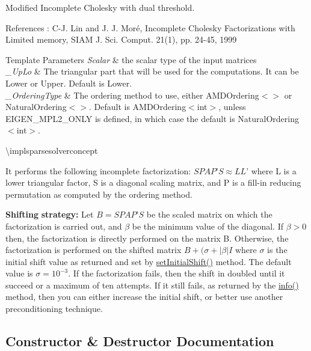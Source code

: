 Modified Incomplete Cholesky with dual threshold. 

References \+: C-\/J. Lin and J. J. Moré, Incomplete Cholesky Factorizations with Limited memory, S\+I\+AM J. Sci. Comput. 21(1), pp. 24-\/45, 1999


\begin{DoxyTemplParams}{Template Parameters}
{\em Scalar} & the scalar type of the input matrices \\
\hline
{\em \+\_\+\+Up\+Lo} & The triangular part that will be used for the computations. It can be Lower or Upper. Default is Lower. \\
\hline
{\em \+\_\+\+Ordering\+Type} & The ordering method to use, either A\+M\+D\+Ordering$<$$>$ or Natural\+Ordering$<$$>$. Default is A\+M\+D\+Ordering$<$int$>$, unless E\+I\+G\+E\+N\+\_\+\+M\+P\+L2\+\_\+\+O\+N\+LY is defined, in which case the default is Natural\+Ordering$<$int$>$.\\
\hline
\end{DoxyTemplParams}
\textbackslash{}implsparsesolverconcept

It performs the following incomplete factorization\+: $ S P A P\text{'} S \approx L L\text{'} $ where L is a lower triangular factor, S is a diagonal scaling matrix, and P is a fill-\/in reducing permutation as computed by the ordering method.

{\bfseries{Shifting}} {\bfseries{strategy\+:}} Let $ B = S P A P\text{'} S $ be the scaled matrix on which the factorization is carried out, and $ \beta $ be the minimum value of the diagonal. If $ \beta > 0 $ then, the factorization is directly performed on the matrix B. Otherwise, the factorization is performed on the shifted matrix $ B + (\sigma+|\beta| I $ where $ \sigma $ is the initial shift value as returned and set by \mbox{\hyperlink{class_eigen_1_1_incomplete_cholesky_a409c9586e7d29566dda2c8f5e38a1228}{set\+Initial\+Shift()}} method. The default value is $ \sigma = 10^{-3} $. If the factorization fails, then the shift in doubled until it succeed or a maximum of ten attempts. If it still fails, as returned by the \mbox{\hyperlink{class_eigen_1_1_incomplete_cholesky_ada0e68cb22601849464506f5986a88c1}{info()}} method, then you can either increase the initial shift, or better use another preconditioning technique. 

\subsection{Constructor \& Destructor Documentation}
\mbox{\label{class_eigen_1_1_incomplete_cholesky_adaaa3975b8cf53f910d6a3344af92379}} 
